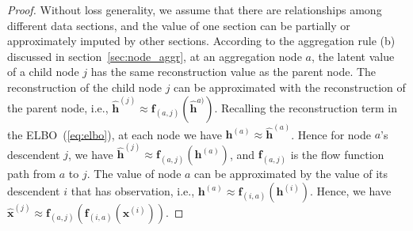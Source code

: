 \documentclass{article}
\newtheorem{remark}{Remark}
\begin{document}
\begin{proof}
Without loss generality, we assume that there are relationships among different data sections, and the value of one section can be partially or approximately imputed by other sections. 
According to the aggregation rule (b) discussed in section~\ref{sec:node_aggr}, at an aggregation node  $a$, the latent value of a child node $j$ has the same reconstruction value as the parent node.  
The reconstruction of the child node $j$ can be approximated with the reconstruction of the parent node, i.e., $\widehat{\mathbf{h}}^{(j)} \approx \mathbf{f}_{(a,j)}(\widehat{\mathbf{h}}^{a)})$. 
Recalling the reconstruction term in the ELBO~(\ref{eq:elbo}), at each node we have $\mathbf{h}^{(a)} \approx \widehat{\mathbf{h}}^{(a)}$. Hence for node $a$'s descendent $j$, we have $\widehat{\mathbf{h}}^{(j)} \approx \mathbf{f}_{(a,j)}(\mathbf{h}^{(a)})$, and $\mathbf{f}_{(a,j)}$ is the flow function path from $a$ to $j$. 
The value of node $a$ can be approximated by the value of its descendent $i$ that has observation, i.e., $\mathbf{h}^{(a)} \approx \mathbf{f}_{(i,a)}(\mathbf{h}^{(i)})$. Hence, we have $\widehat{\mathbf{x}}^{(j)} \approx  \mathbf{f}_{(a,j)}(\mathbf{f}_{(i, a)}(\mathbf{x}^{(i)}))$.

\end{proof}

\end{document}
